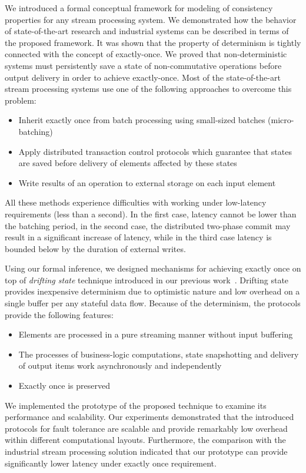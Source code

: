 
\label {fs-conclusion-seciton}

We introduced a formal conceptual framework for modeling of consistency properties for any stream processing system. We demonstrated how the behavior of state-of-the-art research and industrial systems can be described in terms of the proposed framework. It was shown that the property of determinism is tightly connected with the concept of exactly-once. We proved that non-deterministic systems must persistently save a state of non-commutative operations before output delivery in order to achieve exactly-once. Most of the state-of-the-art stream processing systems use one of the following approaches to overcome this problem: 

\begin{itemize}
    \item Inherit exactly once from batch processing using small-sized batches (micro-batching)
    \item Apply distributed transaction control protocols which guarantee that states are saved before delivery of elements affected by these states
    \item Write results of an operation to external storage on each input element
\end{itemize}

All these methods experience difficulties with working under low-latency requirements (less than a second). In the first case, latency cannot be lower than the batching period, in the second case, the distributed two-phase commit may result in a significant increase of latency, while in the third case latency is bounded below by the duration of external writes.

Using our formal inference, we designed mechanisms for achieving exactly once on top of {\em drifting state} technique introduced in our previous work~\cite{we2018adbis}. Drifting state provides inexpensive determinism due to optimistic nature and low overhead on a single buffer per any stateful data flow. Because of the determinism, the protocols provide the following features:

\begin{itemize}
    \item Elements are processed in a pure streaming manner without input buffering
    \item The processes of business-logic computations, state snapshotting and delivery of output items work asynchronously and independently
    \item Exactly once is preserved
\end{itemize}

We implemented the prototype of the proposed technique to examine its performance and scalability. Our experiments demonstrated that the introduced protocols for fault tolerance are scalable and provide remarkably low overhead within different computational layouts. Furthermore, the comparison with the industrial stream processing solution indicated that our prototype can provide significantly lower latency under exactly once requirement.